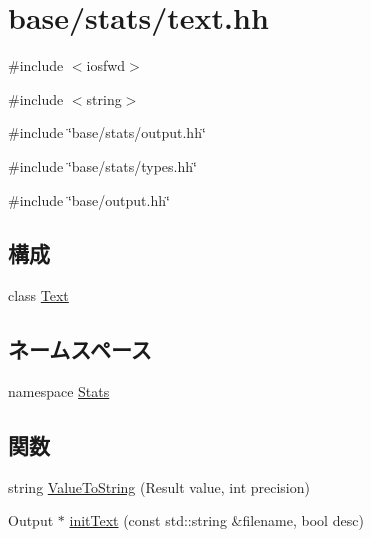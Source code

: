 \hypertarget{text_8hh}{
\section{base/stats/text.hh}
\label{text_8hh}
}
{\ttfamily \#include $<$iosfwd$>$}\par
{\ttfamily \#include $<$string$>$}\par
{\ttfamily \#include \char`\"{}base/stats/output.hh\char`\"{}}\par
{\ttfamily \#include \char`\"{}base/stats/types.hh\char`\"{}}\par
{\ttfamily \#include \char`\"{}base/output.hh\char`\"{}}\par
\subsection*{構成}
\begin{DoxyCompactItemize}
\item 
class \hyperlink{classStats_1_1Text}{Text}
\end{DoxyCompactItemize}
\subsection*{ネームスペース}
\begin{DoxyCompactItemize}
\item 
namespace \hyperlink{namespaceStats}{Stats}
\end{DoxyCompactItemize}
\subsection*{関数}
\begin{DoxyCompactItemize}
\item 
string \hyperlink{namespaceStats_a82baf1560e7ae742b09dae28c115726d}{ValueToString} (Result value, int precision)
\item 
Output $\ast$ \hyperlink{namespaceStats_af375d792139b2c79388c158909cfd684}{initText} (const std::string \&filename, bool desc)
\end{DoxyCompactItemize}
